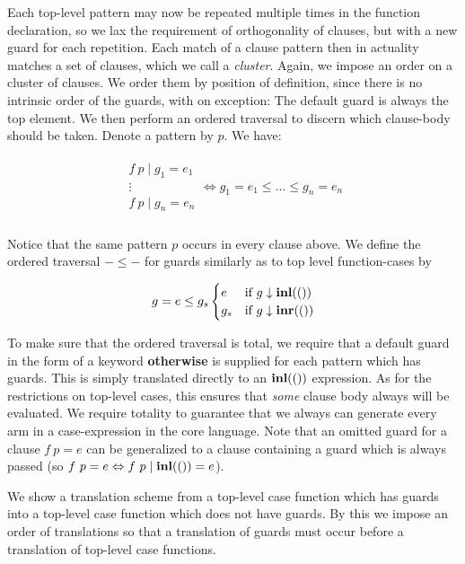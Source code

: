 Each top-level pattern may now be repeated multiple times in the function
declaration, so we lax the requirement of orthogonality of clauses, but with a
new guard for each repetition. Each match of a clause pattern then in actuality
matches a set of clauses, which we call a \emph{cluster}. Again, we impose an
order on a cluster of clauses. We order them by position of definition, since
there is no intrinsic order of the guards, with on exception: The default guard
is always the top element. We then perform an ordered traversal to discern
which clause-body should be taken. Denote a pattern by $p$. We have:

\begin{align*}
  \begin{array}{c}
    f~p \mid g_1 = e_1 \\
      \vdots \\
    f~p \mid g_n = e_n
  \end{array}
  \Leftrightarrow g_1 = e_1 \le \dots \le g_n = e_n \\
\end{align*}

Notice that the same pattern $p$ occurs in every clause above. We define the
ordered traversal $- \le -$ for guards similarly as to top level function-cases
by

\begin{align*}
  g = e \le g_s
  \begin{cases}
    e & \text{if } g \downarrow \textbf{inl}(()) \\
    g_s & \text{if } g \downarrow \textbf{inr}(())
  \end{cases}
\end{align*}

To make sure that the ordered traversal is total, we require that a default
guard in the form of a keyword \textbf{otherwise} is supplied for each pattern
which has guards. This is simply translated directly to an $\textbf{inl}(())$
expression. As for the restrictions on top-level cases, this ensures that
\emph{some} clause body always will be evaluated. We require totality to
guarantee that we always can generate every arm in a case-expression in the
core language. Note that an omitted guard for a clause $f~p = e$ can be
generalized to a clause containing a guard which is always passed (so $f~p = e
\Leftrightarrow f~p \mid \textbf{inl}(()) = e$).

We show a translation scheme from a top-level case function which has guards
into a top-level case function which does not have guards. By this we impose an
order of translations so that a translation of guards must occur before a
translation of top-level case functions.

